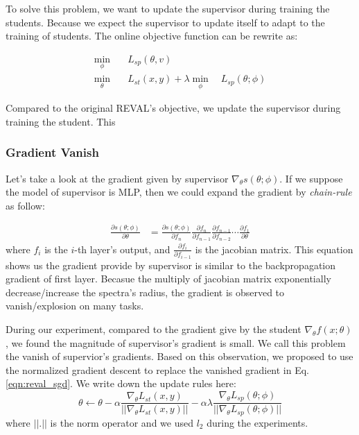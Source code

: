 \documentclass[english]{sobraep}
\begin{document}
To solve this problem, we want to update the supervisor during training the students. Because we expect the supervisor to update itself to adapt to the training of students. The online objective function can be rewrite as:

\begin{align} \label{eqn:reval_online}
    \min \limits_{\phi} \quad &L_{sp}(\theta, v) \\
    \min \limits_{\theta} \quad &L_{st}(x,y) + \lambda \min \limits_{\phi}  \quad L_{sp}(\theta; \phi)
\end{align}

Compared to the original REVAL's objective, we update the supervisor during training the student. This  



\subsubsection{Gradient Vanish}
Let's take a look at the gradient given by supervisor $\nabla_{\theta}s(\theta;\phi)$. If we suppose the model of supervisor is MLP, then we could expand the gradient by \textit{chain-rule} as follow:

\begin{equation*}
    \begin{aligned}
        \frac{\partial s(\theta;\phi)}{\partial \theta} &= \frac{\partial s(\theta;\phi)}{\partial f_n} \frac{\partial f_n}{\partial f_{n-1}}\frac{\partial f_{n-1}}{\partial f_{n-2}}\cdots\frac{\partial f_{1}}{\partial \theta}
    \end{aligned}
\end{equation*}
where $f_i$ is the $i$-th layer's output, and $\frac{\partial f_{i}}{\partial f_{i-1}}$ is the jacobian matrix. This equation shows us the gradient provide by supervisor is similar to the backpropagation gradient of first layer. Becasue the multiply of jacobian matrix exponentially decrease/increase the spectra's radius, the gradient is observed to vanish/explosion on many tasks.  

During our experiment, compared to the gradient give by the student $\nabla_{\theta}f(x;\theta)$, we found the magnitude of supervisor's gradient is small. We call this problem the vanish of supervior's gradients. Based on this observation, we proposed to use the normalized gradient descent to replace the vanished gradient in Eq.\ref{eqn:reval_sgd}. We write down the update rules here:
\begin{equation}\label{eqn:reval_nsgd}
    \theta \xleftarrow{} \theta  - \alpha\frac{\nabla_{\theta}L_{st}(x,y)}{||\nabla_{\theta}L_{st}(x,y)||} - \alpha \lambda\frac{\nabla_{\theta} L_{sp}(\theta; \phi)}{||\nabla_{\theta} L_{sp}(\theta; \phi)||}
\end{equation}
where $||.||$ is the norm operator and we used \textit{$l_2$} during the experiments. 
\end{document}
